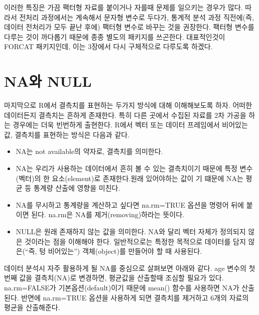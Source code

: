 \documentclass[
]{book}
\newenvironment{Shaded}{\begin{snugshade}}{\end{snugshade}}
\newcommand{\DocumentationTok}[1]{\textcolor[rgb]{0.56,0.35,0.01}{\textbf{\textit{#1}}}}
\newcommand{\FunctionTok}[1]{\textcolor[rgb]{0.00,0.00,0.00}{#1}}
\newcommand{\NormalTok}[1]{#1}
\newcommand{\OtherTok}[1]{\textcolor[rgb]{0.56,0.35,0.01}{#1}}
\newcommand{\SpecialCharTok}[1]{\textcolor[rgb]{0.00,0.00,0.00}{#1}}
\providecommand{\tightlist}{%
  \setlength{\itemsep}{0pt}\setlength{\parskip}{0pt}}
\theoremstyle{definition}
\theoremstyle{definition}
\theoremstyle{definition}
\theoremstyle{definition}
\theoremstyle{remark}
\begin{document}
\begin{Shaded}
\end{Shaded}

이러한 특징은 가끔 팩터형 자료를 붙이거나 자를때 문제를 일으키는 경우가 많다. 따라서 전처리 과정에서는 계속해서 문자형 변수로 두다가, 통계적 분석 과정 직전에(즉, 데이터 전처리가 모두 끝난 후에) 팩터형 변수로 바꾸는 것을 권장한다.
팩터형 변수를 다루는 것이 까다롭기 때문에 종종 별도의 패키지를 쓰곤한다. 대표적인것이 FORCAT 패키지인데, 이는 3장에서 다시 구체적으로 다루도록 하겠다.

\hypertarget{nauxc640-null}{%
\section{NA와 NULL}\label{nauxc640-null}}

마지막으로 R에서 결측치를 표현하는 두가지 방식에 대해 이해해보도록 하자. 어떠한 데이터든지 결측치는 흔하게 존재한다. 특히 다른 곳에서 수집된 자료를 2차 가공을 하는 경우에는 더욱 빈번하게 출현한다. R에서 벡터 또는 데이터 프레임에서 비어있는 값, 결측치를 표현하는 방식은 다음과 같다.

\begin{itemize}
\tightlist
\item
  NA는 not available의 약자로, 결측치를 의미한다.\\
\item
  NA는 우리가 사용하는 데이터에서 흔히 볼 수 있는 결측치이기 때문에 특정 변수(벡터)의 한 요소(element)로 존재한다.원래 있어야하는 값이 기 떄문에 NA는 평균 등 통계량 산출에 영향을 미친다.
\item
  NA를 무시하고 통계량을 계산하고 싶다면 na.rm=TRUE 옵션을 명령어 뒤에 붙이면 된다. na.rm은 NA를 제거(removing)하라는 뜻이다.
\item
  NULL은 원래 존재하지 않는 값을 의미한다. NA와 달리 벡터 자체가 정의되지 않은 것이라는 점을 이해해야 한다. 일반적으로는 특정한 목적으로 데이터를 담지 않은(``즉, 텅 비어있는'') 객체(object)를 만들어야 할 때 사용된다.
\end{itemize}

데이터 분석시 자주 활용하게 될 NA를 중심으로 살펴보면 아래와 같다. age 변수의 첫번째 값을 결측치(NA)로 변경하면, 평균값을 산출할때 조심할 필요가 있다. na.rm=FALSE가 기본옵션(default)이기 때문에 mean() 함수를 사용하면 NA가 산출된다. 반면에 na.rm=TRUE 옵션을 사용하게 되면 결측치를 제거하고 6개의 자료의 평균을 산출해준다.
\end{document}
